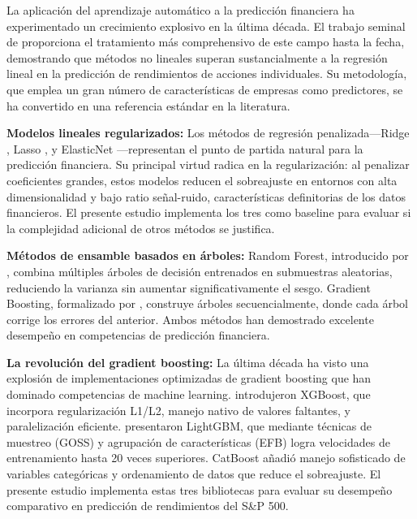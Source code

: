 \documentclass[11pt,a4paper]{article}
\begin{document}
La aplicación del aprendizaje automático a la predicción financiera ha experimentado un crecimiento explosivo en la última década. El trabajo seminal de \citet{gu2020} proporciona el tratamiento más comprehensivo de este campo hasta la fecha, demostrando que métodos no lineales superan sustancialmente a la regresión lineal en la predicción de rendimientos de acciones individuales. Su metodología, que emplea un gran número de características de empresas como predictores, se ha convertido en una referencia estándar en la literatura.

\textbf{Modelos lineales regularizados:} Los métodos de regresión penalizada---Ridge \citep{hoerl1970ridge}, Lasso \citep{tibshirani1996lasso}, y ElasticNet \citep{zou2005elasticnet}---representan el punto de partida natural para la predicción financiera. Su principal virtud radica en la regularización: al penalizar coeficientes grandes, estos modelos reducen el sobreajuste en entornos con alta dimensionalidad y bajo ratio señal-ruido, características definitorias de los datos financieros. El presente estudio implementa los tres como baseline para evaluar si la complejidad adicional de otros métodos se justifica.

\textbf{Métodos de ensamble basados en árboles:} Random Forest, introducido por \citet{breiman2001random}, combina múltiples árboles de decisión entrenados en submuestras aleatorias, reduciendo la varianza sin aumentar significativamente el sesgo. Gradient Boosting, formalizado por \citet{friedman2001greedy}, construye árboles secuencialmente, donde cada árbol corrige los errores del anterior. Ambos métodos han demostrado excelente desempeño en competencias de predicción financiera.

\textbf{La revolución del gradient boosting:} La última década ha visto una explosión de implementaciones optimizadas de gradient boosting que han dominado competencias de machine learning. \citet{chen2016xgboost} introdujeron XGBoost, que incorpora regularización L1/L2, manejo nativo de valores faltantes, y paralelización eficiente. \citet{ke2017} presentaron LightGBM, que mediante técnicas de muestreo (GOSS) y agrupación de características (EFB) logra velocidades de entrenamiento hasta 20 veces superiores. CatBoost \citep{prokhorenkova2018catboost} añadió manejo sofisticado de variables categóricas y ordenamiento de datos que reduce el sobreajuste. El presente estudio implementa estas tres bibliotecas para evaluar su desempeño comparativo en predicción de rendimientos del S\&P 500.
\end{document}
